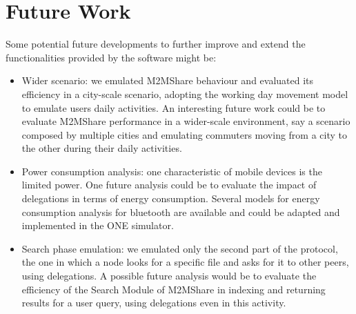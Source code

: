 \section{Future Work}
Some potential future developments to further improve and extend the functionalities provided by the software might be:
\begin{itemize}
\item Wider scenario: we emulated M2MShare behaviour and evaluated its efficiency in a city-scale scenario, adopting the working day movement model to emulate users daily activities. An interesting future work could be to evaluate M2MShare performance in a wider-scale environment, say a scenario composed by multiple cities and emulating commuters moving from a city to the other during their daily activities.
\item Power consumption analysis: one characteristic of mobile devices is the limited power. One future analysis could be to evaluate the impact of delegations in terms of energy consumption. Several models for  energy consumption analysis for bluetooth are available and could be adapted and implemented in the ONE simulator.
\item Search phase emulation: we emulated only the second part of the protocol, the one in which a node looks for a specific file and asks for it to other peers, using delegations. A possible future analysis would be to evaluate the efficiency of the Search Module of M2MShare in indexing and returning results for a user query, using delegations even in this activity.
\end{itemize}

 

